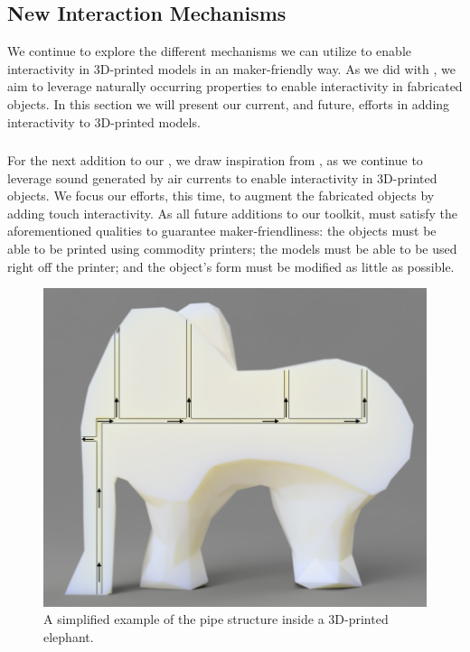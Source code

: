     \subsection{New Interaction Mechanisms}
      We continue to explore the different mechanisms we can utilize to enable
      interactivity in 3D-printed models in an maker-friendly way. As we did
      with \bh, we aim to leverage naturally occurring properties to enable
      interactivity in fabricated objects. In this section we will present our
      current, and future, efforts in adding interactivity to 3D-printed
      models.

      \subsubsection{\at}
        For the next addition to our \itoolkit, we draw inspiration from \bh,
        as we continue to leverage sound generated by air currents to enable
        interactivity in 3D-printed objects. We focus our efforts, this time,
        to augment the fabricated objects by adding touch interactivity. As all
        future additions to our toolkit, \at must satisfy the aforementioned
        qualities to guarantee maker-friendliness: the objects must be able to
        be printed using commodity printers; the models must be able to be used
        right off the printer; and the object's form must be modified as little
        as possible.

        \begin{figure}
          \centering
            \includegraphics[width=.9\columnwidth]{figures/elephant-airtouch.png}
            \caption{A simplified example of the pipe structure inside a
              3D-printed elephant.}
            \label{fig:elephant-airtouch}
        \end{figure}


